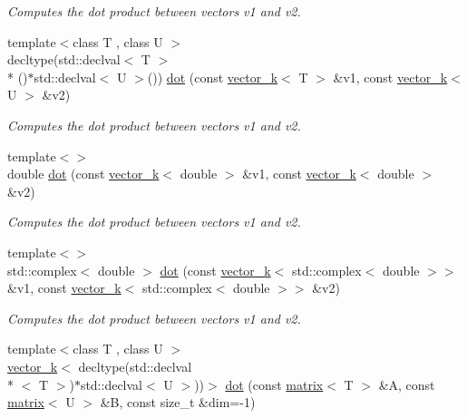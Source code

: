 \begin{DoxyCompactItemize}
\begin{DoxyCompactList}\small\item\em Computes the dot product between vectors v1 and v2. \end{DoxyCompactList}\item 
\hypertarget{namespacekeycpp_a04dabe064e99dd423157829c4b133261}{{\footnotesize template$<$class T , class U $>$ }\\decltype(std\-::declval$<$ T $>$\\*
()$\ast$std\-::declval$<$ U $>$()) \hyperlink{namespacekeycpp_a04dabe064e99dd423157829c4b133261}{dot} (const \hyperlink{classkeycpp_1_1vector__k}{vector\-\_\-k}$<$ T $>$ \&v1, const \hyperlink{classkeycpp_1_1vector__k}{vector\-\_\-k}$<$ U $>$ \&v2)}\label{namespacekeycpp_a04dabe064e99dd423157829c4b133261}

\begin{DoxyCompactList}\small\item\em Computes the dot product between vectors v1 and v2. \end{DoxyCompactList}\item 
\hypertarget{namespacekeycpp_a3b8c1401db056696103c4ad8f1aa48ce}{{\footnotesize template$<$$>$ }\\double \hyperlink{namespacekeycpp_a3b8c1401db056696103c4ad8f1aa48ce}{dot} (const \hyperlink{classkeycpp_1_1vector__k}{vector\-\_\-k}$<$ double $>$ \&v1, const \hyperlink{classkeycpp_1_1vector__k}{vector\-\_\-k}$<$ double $>$ \&v2)}\label{namespacekeycpp_a3b8c1401db056696103c4ad8f1aa48ce}

\begin{DoxyCompactList}\small\item\em Computes the dot product between vectors v1 and v2. \end{DoxyCompactList}\item 
\hypertarget{namespacekeycpp_a3499b51e89dfda97b0dcf5dc2461926a}{{\footnotesize template$<$$>$ }\\std\-::complex$<$ double $>$ \hyperlink{namespacekeycpp_a3499b51e89dfda97b0dcf5dc2461926a}{dot} (const \hyperlink{classkeycpp_1_1vector__k}{vector\-\_\-k}$<$ std\-::complex$<$ double $>$$>$ \&v1, const \hyperlink{classkeycpp_1_1vector__k}{vector\-\_\-k}$<$ std\-::complex$<$ double $>$$>$ \&v2)}\label{namespacekeycpp_a3499b51e89dfda97b0dcf5dc2461926a}

\begin{DoxyCompactList}\small\item\em Computes the dot product between vectors v1 and v2. \end{DoxyCompactList}\item 
\hypertarget{namespacekeycpp_a0d4eac6fbefd72947d7fe26fada6c221}{{\footnotesize template$<$class T , class U $>$ }\\\hyperlink{classkeycpp_1_1vector__k}{vector\-\_\-k}$<$ decltype(std\-::declval\\*
$<$ T $>$)$\ast$std\-::declval$<$ U $>$))$>$ \hyperlink{namespacekeycpp_a0d4eac6fbefd72947d7fe26fada6c221}{dot} (const \hyperlink{classkeycpp_1_1matrix}{matrix}$<$ T $>$ \&A, const \hyperlink{classkeycpp_1_1matrix}{matrix}$<$ U $>$ \&B, const size\-\_\-t \&dim=-\/1)}\label{namespacekeycpp_a0d4eac6fbefd72947d7fe26fada6c221}


\end{DoxyCompactItemize}
